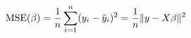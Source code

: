 \documentclass[preview]{standalone}
\begin{document}
\begin{align*}
\special{dvisvgm:raw <g id='unique000'>}\text{MSE}(\beta) = \frac{1}{n}\sum_{i=1}^{n}(y_i - \hat{y}_i)^2 \special{dvisvgm:raw </g>}\special{dvisvgm:raw <g id='unique001'>}= \frac{1}{n}\|y - X\beta\|^2\special{dvisvgm:raw </g>}
\end{align*}
\end{document}
